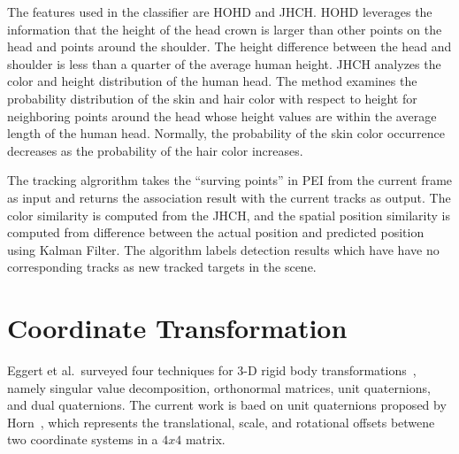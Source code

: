 The features used in the classifier are HOHD and JHCH. HOHD leverages the information that the height of the head crown is larger than other points on the head and points around the shoulder. The height difference between the head and shoulder is less than a quarter of the average human height. JHCH analyzes the color and height distribution of the human head. The method examines the probability distribution of the skin and hair color with respect to height for neighboring points around the head whose height values are within the average length of the human head. Normally, the probability of the skin color occurrence decreases as the probability of the hair color increases.

The tracking algrorithm takes the ``surving points'' in PEI from the current frame as input and returns the association result with the current tracks as output. The color similarity is computed from the JHCH, and the spatial position similarity is computed from difference between the actual position and predicted position using Kalman Filter. The algorithm labels detection results which have have no corresponding tracks as new tracked targets in the scene.



\section{Coordinate Transformation}

Eggert et al.\ surveyed four techniques for 3-D rigid body transformations~\cite{eggert_four_algorithms}, namely singular value decomposition, orthonormal matrices, unit quaternions, and dual quaternions. The current work is baed on unit quaternions proposed by Horn~\cite{horn_unit_quaternions}, which represents the translational, scale, and rotational offsets betwene two coordinate systems in a $4x4$ matrix.

